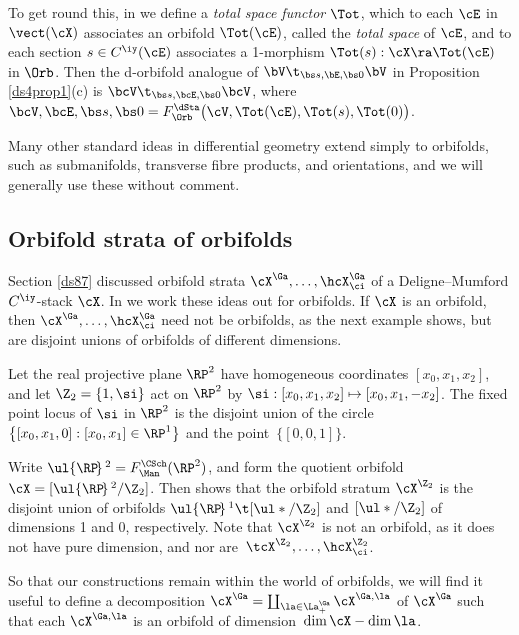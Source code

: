 \documentclass{article}
\begin{document}
To get round this, in \cite[\S 8.3]{Joyc6} we define a {\it total
space functor\/} $\Tot$, which to each $\cE$ in $\vect(\cX)$ associates an
orbifold $\Tot(\cE)$, called the {\it total space\/} of $\cE$, and
to each section $s\in C^\iy(\cE)$ associates a 1-morphism
$\Tot(s):\cX\ra\Tot(\cE)$ in $\Orb$. Then the d-orbifold analogue of
$\bV\t_{\bs s,\bE,\bs 0}\bV$ in Proposition \ref{ds4prop1}(c) is
$\bcV\t_{\bs s,\bcE,\bs 0}\bcV$, where~$\bcV,\bcE,\bs s,\bs
0=F_\Orb^\dSta\bigl(\cV,\Tot(\cE),\Tot(s),\Tot(0)\bigr)$.

Many other standard ideas in differential geometry extend simply to
orbifolds, such as submanifolds, transverse fibre products, and
orientations, and we will generally use these without
comment.

\subsection{Orbifold strata of orbifolds}
\label{ds92}

Section \ref{ds87} discussed orbifold strata $\cX^\Ga,\ldots,
\hcX^\Ga_\ci$ of a Deligne--Mumford $C^\iy$-stack $\cX$. In \cite[\S
8.4]{Joyc6} we work these ideas out for orbifolds. If $\cX$ is an
orbifold, then $\cX^\Ga,\ldots, \hcX^\Ga_\ci$ need not be orbifolds,
as the next example shows, but are disjoint unions of orbifolds of
different dimensions.

\begin{ex} Let the real projective plane $\RP^2$ have homogeneous
coordinates $[x_0,x_1,x_2]$, and let $\Z_2=\{1,\si\}$ act on $\RP^2$
by $\si:[x_0,x_1,x_2]\mapsto[x_0,x_1,-x_2]$. The fixed point locus
of $\si$ in $\RP^2$ is the disjoint union of the circle
$\bigl\{[x_0,x_1,0]:[x_0,x_1]\in\RP^1\bigr\}$ and the
point~$\bigl\{[0,0,1]\}$.

Write $\ul{\RP\!}\,^2=F_\Man^\CSch(\RP^2)$, and form the quotient
orbifold $\cX=[\ul{\RP\!}\,^2/\Z_2]$. Then  shows that
the orbifold stratum $\cX^{\Z_2}$ is the disjoint union of orbifolds
$\ul{\RP\!}\,^1\t[\ul */\Z_2]$ and $[\ul */\Z_2]$ of dimensions 1
and 0, respectively. Note that $\cX^{\Z_2}$ is not an orbifold, as
it does not have pure dimension, and nor are~$\tcX^{\Z_2},\ldots,
\hcX^{\Z_2}_\ci$.
\label{ds9ex1}
\end{ex}

So that our constructions remain within the world of orbifolds, we
will find it useful to define a decomposition
$\cX^\Ga=\coprod_{\smash{\la\in\La^\Ga_+}}\cX^{\Ga,\la}$ of
$\cX^\Ga$ such that each $\cX^{\Ga,\la}$ is an orbifold of
dimension~$\dim\cX-\dim\la$.
\end{document}
